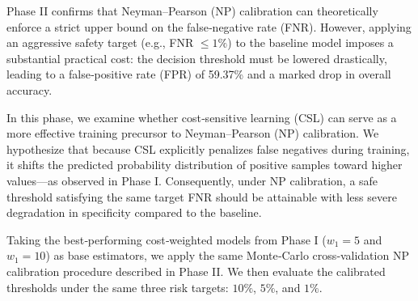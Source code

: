 \documentclass[journal,twoside,web]{ieeecolor}
\begin{document}
Phase II confirms that Neyman–Pearson (NP) calibration can theoretically enforce a strict upper bound on the false‑negative rate (FNR). However, applying an aggressive safety target (e.g., FNR $\leq 1\%$) to the baseline model imposes a substantial practical cost: the decision threshold must be lowered drastically, leading to a false‑positive rate (FPR) of 59.37\% and a marked drop in overall accuracy.

In this phase, we examine whether cost‑sensitive learning (CSL) can serve as a more effective training precursor to Neyman–Pearson (NP) calibration. We hypothesize that because CSL explicitly penalizes false negatives during training, it shifts the predicted probability distribution of positive samples toward higher values—as observed in Phase I. Consequently, under NP calibration, a safe threshold satisfying the same target FNR should be attainable with less severe degradation in specificity compared to the baseline.

Taking the best‑performing cost‑weighted models from Phase I (\(w_{1}=5\) and \(w_{1}=10\)) as base estimators, we apply the same Monte‑Carlo cross‑validation NP calibration procedure described in Phase II. We then evaluate the calibrated thresholds under the same three risk targets: \(10\%\), \(5\%\), and \(1\%\).


\begin{table}[htbp]
    \centering
    \caption{The prediction performance with cost-sensitive learning boosting NP threshold calibration.}
    \label{tab:csl_np_results}
\end{table}
\end{document}

